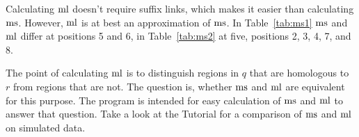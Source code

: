 \begin{algorithm}
  \caption{Calculate match lengths.}\label{alg:ml}
  \begin{algorithmic}[1]
    
  \end{algorithmic}
\end{algorithm}

Calculating $\mathrm{ml}$ doesn't require suffix links, which makes it easier
than calculating $\mathrm{ms}$. However, $\mathrm{ml}$ is at best an approximation of
$\mathrm{ms}$. In Table~\ref{tab:ms1} $\mathrm{ms}$ and $\mathrm{ml}$ differ at positions 5
and 6, in Table~\ref{tab:ms2} at five, positions 2, 3, 4, 7, and 8.

The point of calculating $\mathrm{ml}$ is to distinguish regions in $q$ that
are homologous to $r$ from regions that are not. The question is,
whether $\mathrm{ms}$ and $\mathrm{ml}$ are equivalent for this purpose. The
program  is intended for easy calculation of $\mathrm{ms}$ and $\mathrm{ml}$
to answer that question. Take a look at the Tutorial for a comparison
of $\mathrm{ms}$ and $\mathrm{ml}$ on simulated data.
